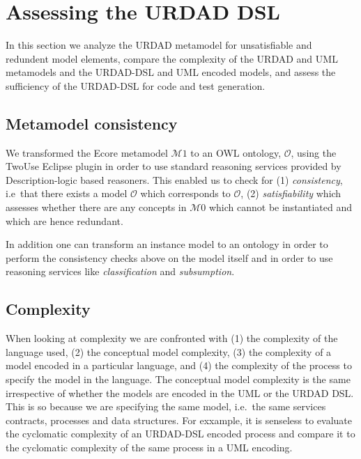 \section{Assessing the URDAD DSL \label{sec:assessment}}

In this section we analyze the URDAD metamodel for unsatisfiable and redundent model elements, compare the complexity of the URDAD and UML metamodels and the URDAD-DSL and UML encoded models, and assess the sufficiency of the URDAD-DSL for code and test generation.


\subsection{Metamodel consistency}

We transformed the Ecore metamodel $\mathcal{M}1$ to an OWL ontology, $\mathcal{O}$, using the TwoUse \cite{parreiras_using_2010} Eclipse plugin in order to use standard reasoning services provided by Description-logic based reasoners. This enabled us to check for (1) \emph{consistency}, i.e\ that there exists a model $\mathcal{O}$ which corresponds to $\mathcal{O}$, (2) \emph{satisfiability} which assesses whether there are any concepts in $\mathcal{M}0$ which cannot be instantiated and which are hence redundant.

In addition one can transform an instance model to an ontology in order to perform the consistency checks above on the model itself and in order to use reasoning services like \emph{classification} and \emph{subsumption}.


\subsection{Complexity}

When looking at complexity we are confronted with (1) the complexity of the language used, (2) the conceptual model complexity, (3) the complexity of a model encoded in a particular language, and (4) the complexity of the process to specify the model in the language. The conceptual model complexity is the same irrespective of whether the models are encoded in the UML or the URDAD DSL. This is so because we are specifying the same model, i.e.\ the same services contracts, processes and data structures. For exxample, it is senseless to evaluate the cyclomatic complexity \cite{mccabe_complexity_1976} of an URDAD-DSL encoded process and compare it to the cyclomatic complexity of the same process in a UML encoding.

